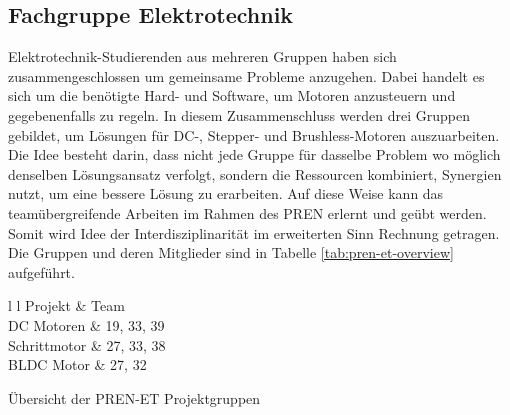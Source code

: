 \subsection{Fachgruppe Elektrotechnik}
\label{sec:pren-et}
Elektrotechnik-Studierenden aus mehreren Gruppen haben sich
zusammengeschlossen um gemeinsame Probleme anzugehen. Dabei handelt es sich
um die benötigte Hard- und Software, um Motoren anzusteuern
und gegebenenfalls zu regeln. In diesem Zusammenschluss werden drei Gruppen
gebildet, um Lösungen für DC-, Stepper- und Brushless-Motoren auszuarbeiten.
Die Idee besteht darin, dass nicht jede Gruppe für dasselbe Problem wo
möglich denselben Lösungsansatz verfolgt, sondern die Ressourcen kombiniert,
Synergien nutzt, um eine bessere Lösung zu erarbeiten. Auf diese Weise kann
das teamübergreifende Arbeiten im Rahmen des PREN erlernt und
geübt werden. Somit wird Idee der Interdisziplinarität im erweiterten Sinn
Rechnung getragen. Die Gruppen und deren Mitglieder sind in Tabelle 
\ref{tab:pren-et-overview} aufgeführt.
\begin{table}[h!]
	\centering
	\begin{zebratabular}{l l}
		 Projekt		& Team \\
		DC Motoren   & 19, 33, 39 \\
		Schrittmotor & 27, 33, 38 \\
		BLDC Motor   & 27, 32 \\
	\end{zebratabular}
	\caption{Übersicht der PREN-ET Projektgruppen}
	\label{tab:pren-et-overview}
\end{table}
